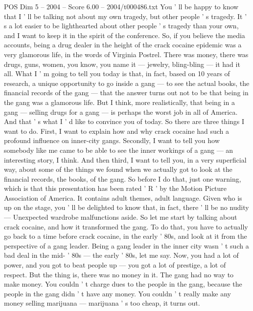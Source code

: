 \begin{textsample}{POS Dim 5 – 2004 – Score 6.00 – 2004/t000486.txt}  \label{ex:f5_pos_018}
You ' ll be happy to know that I ' ll be talking not about my own tragedy, but other people ' s tragedy.
It ' s a lot easier to be lighthearted about other people ' s tragedy than your own, and I want to keep it in the spirit of the conference.
So, if you believe the media accounts, being a drug dealer in the height of the crack cocaine epidemic was a very glamorous life, in the words of Virginia Postrel.
There was money, there was drugs, guns, women, you know, you name it — jewelry, bling-bling — it had it all.
What I ' m going to tell you today is that, in fact, based on 10 years of research, a unique opportunity to go inside a gang — to see the actual books, the financial records of the gang — that the answer turns out not to be that being in the gang was a glamorous life.
But I think, more realistically, that being in a gang — selling drugs for a gang — is perhaps the worst job in all of America.
And that ' s what I ' d like to convince you of today.
So there are three things I want to do.
First, I want to explain how and why crack cocaine had such a profound influence on inner-city gangs.
Secondly, I want to tell you how somebody like me came to be able to see the inner workings of a gang — an interesting story, I think.
And then third, I want to tell you, in a very superficial way, about some of the things we found when we actually got to look at the financial records, the books, of the gang.
So before I do that, just one warning, which is that this presentation has been rated ' R ' by the Motion Picture Association of America.
It contains adult themes, adult language.
Given who is up on the stage, you ' ll be delighted to know that, in fact, there ' ll be no nudity — Unexpected wardrobe malfunctions aside.
So let me start by talking about crack cocaine, and how it transformed the gang.
To do that, you have to actually go back to a time before crack cocaine, in the early ' 80s, and look at it from the perspective of a gang leader.
Being a gang leader in the inner city wasn ' t such a bad deal in the mid- ' 80s — the early ' 80s, let me say.
Now, you had a lot of power, and you got to beat people up — you got a lot of prestige, a lot of respect.
But the thing is, there was no money in it.
The gang had no way to make money.
You couldn ' t charge dues to the people in the gang, because the people in the gang didn ' t have any money.
You couldn ' t really make any money selling marijuana — marijuana ' s too cheap, it turns out.

\end{textsample}
